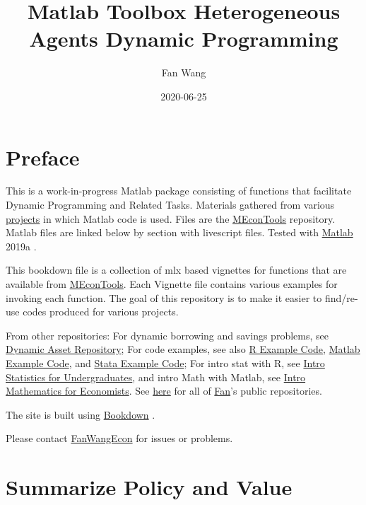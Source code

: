 \documentclass[
]{book}
\title{Matlab Toolbox Heterogeneous Agents Dynamic Programming}
\author{Fan Wang}
\date{2020-06-25}
\begin{document}
\maketitle

{
\hypersetup{linkcolor=}
\setcounter{tocdepth}{1}
\tableofcontents
}
\hypertarget{preface}{%
\chapter*{Preface}\label{preface}}

This is a work-in-progress Matlab package consisting of functions that facilitate Dynamic Programming and Related Tasks. Materials gathered from various \href{https://fanwangecon.github.io/research}{projects} in which Matlab code is used. Files are the \href{https://github.com/FanWangEcon/MEconTools}{MEconTools} repository. Matlab files are linked below by section with livescript files. Tested with \href{https://www.mathworks.com/products/matlab.html}{Matlab} 2019a \citep{matlab}.

This bookdown file is a collection of mlx based vignettes for functions that are available from \href{https://github.com/FanWangEcon/MEconTools}{MEconTools}. Each Vignette file contains various examples for invoking each function. The goal of this repository is to make it easier to find/re-use codes produced for various projects.

From other repositories: For dynamic borrowing and savings problems, see \href{https://fanwangecon.github.io/CodeDynaAsset/}{Dynamic Asset Repository}; For code examples, see also \href{https://fanwangecon.github.io/R4Econ/}{R Example Code}, \href{https://fanwangecon.github.io/M4Econ/}{Matlab Example Code}, and \href{https://fanwangecon.github.io/Stata4Econ/}{Stata Example Code}; For intro stat with R, see \href{https://fanwangecon.github.io/Stat4Econ/}{Intro Statistics for Undergraduates}, and intro Math with Matlab, see \href{https://fanwangecon.github.io/Math4Econ/}{Intro Mathematics for Economists}. See \href{https://github.com/FanWangEcon}{here} for all of \href{https://fanwangecon.github.io/}{Fan}'s public repositories.

The site is built using \href{https://bookdown.org/}{Bookdown} \citep{R-bookdown}.

Please contact \href{https://fanwangecon.github.io/}{FanWangEcon} for issues or problems.

\hypertarget{summarize-policy-and-value}{%
\chapter{Summarize Policy and Value}\label{summarize-policy-and-value}}
\end{document}
